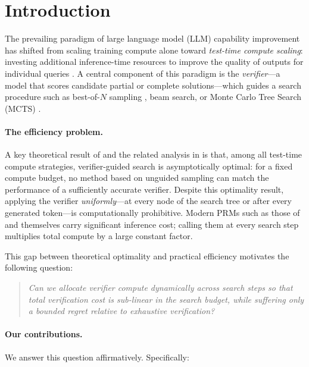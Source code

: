 \section{Introduction}
\label{sec:introduction}

The prevailing paradigm of large language model (LLM) capability improvement has
shifted from scaling training compute alone toward \emph{test-time compute scaling}:
investing additional inference-time resources to improve the quality of outputs for
individual queries \citep{snell2024scaling,brown2024large,openai2024o1}.
A central component of this paradigm is the \emph{verifier}---a model that scores
candidate partial or complete solutions---which guides a search procedure such as
best-of-$N$ sampling \citep{cobbe2021training}, beam search, or Monte Carlo Tree
Search (MCTS) \citep{silver2016mastering,guo2025deepseek}.

\paragraph{The efficiency problem.}
A key theoretical result of \citet{setlur2024rewarding} and the related analysis in
\citet{snell2024scaling} is that, among all test-time compute strategies, verifier-guided
search is asymptotically optimal: for a fixed compute budget, no method based on
unguided sampling can match the performance of a sufficiently accurate verifier.
Despite this optimality result, applying the verifier \emph{uniformly}---at every
node of the search tree or after every generated token---is computationally
prohibitive. Modern PRMs such as those of \citet{lightman2023lets} and
\citet{wang2024math} themselves carry significant inference cost; calling them
at every search step multiplies total compute by a large constant factor.

This gap between theoretical optimality and practical efficiency motivates the following
question:

\begin{quote}
\emph{Can we allocate verifier compute dynamically across search steps so that
total verification cost is sub-linear in the search budget, while suffering only
a bounded regret relative to exhaustive verification?}
\end{quote}

\paragraph{Our contributions.}
We answer this question affirmatively. Specifically:

